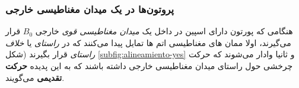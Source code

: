 \subsubsection{پروتون‌ها در یک میدان مغناطیسی خارجی}


هنگامی که پورتون دارای اسپین در داخل یک \textit{میدان مغناطیسی قوی }
خارجی $B_0$ قرار می‌گیرند، اولا ممان های مغناطیسی اتم ها تمایل پیدا می‌کنند که در \textit{راستای} یا \textit{خلاف راستای} 
قرار بگیرند (شکل \ref{subfig:alineamiento-yes} و ثانیا وادار می‌شوند که حرکت چرخشی حول راستای میدان مغناطیسی خارجی داشته باشند که به این پدیده \textbf{حرکت تقدیمی}
می‌گویند. 

\begin{figure}
	\centering{}
	\caption{}
	\label{fig:zeeman-diagram}
\end{figure}



